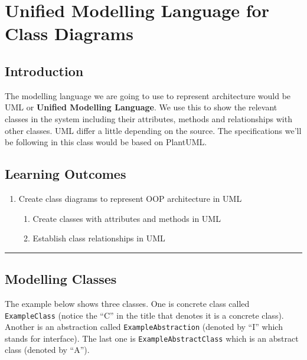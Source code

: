 \chapter{Unified Modelling Language for Class
Diagrams}\label{unified-modelling-language-for-class-diagrams.md__unified-modelling-language-for-class-diagrams}

\section{Introduction}\label{unified-modelling-language-for-class-diagrams.md__introduction}

The modelling language we are going to use to represent architecture
would be UML or \textbf{Unified Modelling Language}. We use this to show
the relevant classes in the system including their attributes, methods
and relationships with other classes. UML differ a little depending on
the source. The specifications we'll be following in this class would be
based on PlantUML.

\section{Learning
Outcomes}\label{unified-modelling-language-for-class-diagrams.md__learning-outcomes}

\begin{enumerate}
\def\labelenumi{\arabic{enumi}.}
\tightlist
\item
  Create class diagrams to represent OOP architecture in UML

  \begin{enumerate}
  \def\labelenumii{\arabic{enumii}.}
  \tightlist
  \item
    Create classes with attributes and methods in UML
  \item
    Establish class relationships in UML
  \end{enumerate}
\end{enumerate}

\begin{center}\rule{0.5\linewidth}{0.5pt}\end{center}

\section{Modelling
Classes}\label{unified-modelling-language-for-class-diagrams.md__modelling-classes}

The example below shows three classes. One is concrete class called
\texttt{ExampleClass} (notice the ``C'' in the title that denotes it is
a concrete class). Another is an abstraction called
\texttt{ExampleAbstraction} (denoted by ``I'' which stands for
interface). The last one is \texttt{ExampleAbstractClass} which is an
abstract class (denoted by ``A'').

